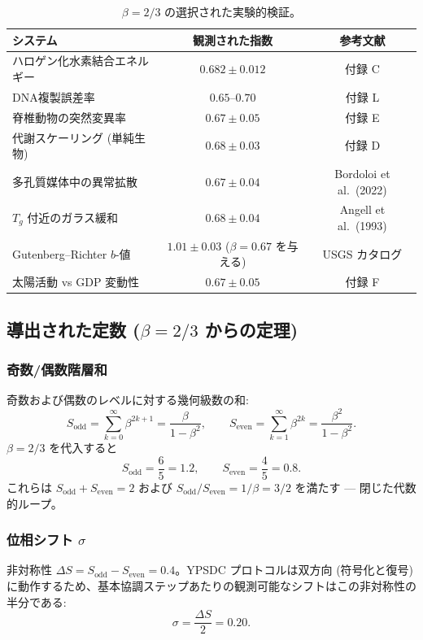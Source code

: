 \documentclass[11pt,a4paper]{article}
\theoremstyle{remark}
\begin{document}
	\begin{table}[H]
		\centering
		\caption{\(\beta = 2/3\) の選択された実験的検証。}
		\label{tab:beta-evidence}
		\small
		\begin{tabular}{l c c}
			\toprule
			\textbf{システム} & \textbf{観測された指数} & \textbf{参考文献} \\
			\midrule
			ハロゲン化水素結合エネルギー & \(0.682 \pm 0.012\) & 付録 C \\
			DNA複製誤差率 & \(0.65\)–\(0.70\) & 付録 L \\
			脊椎動物の突然変異率 & \(0.67 \pm 0.05\) & 付録 E \\
			代謝スケーリング (単純生物) & \(0.68 \pm 0.03\) & 付録 D \\
			多孔質媒体中の異常拡散 & \(0.67 \pm 0.04\) & Bordoloi et al.\ (2022) \\
			\(T_g\) 付近のガラス緩和 & \(0.68 \pm 0.04\) & Angell et al.\ (1993) \\
			Gutenberg–Richter \(b\)-値 & \(1.01 \pm 0.03\) (\(\beta=0.67\) を与える) & USGS カタログ \\
			太陽活動 vs GDP 変動性 & \(0.67 \pm 0.05\) & 付録 F \\
			\bottomrule
		\end{tabular}
	\end{table}
	
	\subsection{導出された定数 (\(\beta = 2/3\) からの定理)}
	
	\subsubsection{奇数/偶数階層和}
	奇数および偶数のレベルに対する幾何級数の和:
	\[
	S_{\mathrm{odd}} = \sum_{k=0}^{\infty} \beta^{2k+1} = \frac{\beta}{1-\beta^2},\qquad
	S_{\mathrm{even}} = \sum_{k=1}^{\infty} \beta^{2k} = \frac{\beta^2}{1-\beta^2}.
	\]
	\(\beta = 2/3\) を代入すると
	\[
	\boxed{S_{\mathrm{odd}} = \frac{6}{5}=1.2,\qquad S_{\mathrm{even}} = \frac{4}{5}=0.8}.
	\]
	これらは \(S_{\mathrm{odd}}+S_{\mathrm{even}}=2\) および \(S_{\mathrm{odd}}/S_{\mathrm{even}} = 1/\beta = 3/2\) を満たす — 閉じた代数的ループ。
	
	\subsubsection{位相シフト \(\sigma\)}
	非対称性 \(\Delta S = S_{\mathrm{odd}}-S_{\mathrm{even}} = 0.4\)。YPSDC プロトコルは双方向 (符号化と復号) に動作するため、基本協調ステップあたりの観測可能なシフトはこの非対称性の半分である:
	\[
	\boxed{\sigma = \frac{\Delta S}{2} = 0.20}.
	\]
	
\end{document}
